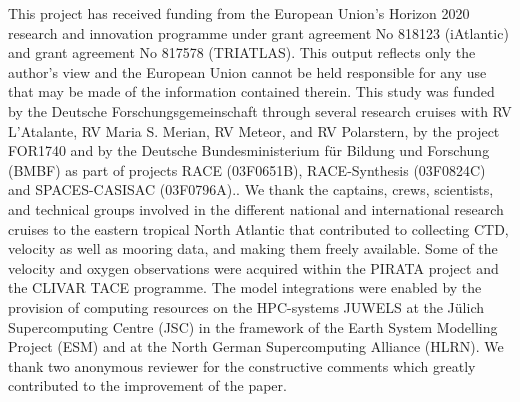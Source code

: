 \documentclass[os, manuscript]{copernicus}
\begin{document}

\begin{acknowledgements}
	This project has received funding from the European Union’s Horizon 2020 research and innovation programme under grant agreement No 818123 (iAtlantic) and grant agreement No 817578 (TRIATLAS). This output reflects only the author’s view and the European Union cannot be held responsible for any use that may be  made of the information contained therein. This study was funded by the Deutsche Forschungsgemeinschaft through several research cruises with RV L'Atalante, RV Maria S. Merian, RV Meteor, and RV Polarstern, by the project FOR1740 and by the Deutsche Bundesministerium f\"{u}r Bildung und Forschung (BMBF) as part of projects RACE (03F0651B), RACE-Synthesis (03F0824C) and SPACES-CASISAC (03F0796A).. We thank the captains, crews, scientists, and technical groups involved in the different national and international research cruises to the eastern tropical North Atlantic that contributed to collecting CTD, velocity as well as mooring data, and making them freely available. Some of the velocity and oxygen observations were acquired within the PIRATA project and the CLIVAR TACE programme. The model integrations were enabled by the provision of computing resources on the HPC-systems JUWELS at the Jülich Supercomputing Centre (JSC) in the framework of the Earth System Modelling Project (ESM) and at the North German Supercomputing Alliance (HLRN). We thank two anonymous reviewer for the constructive comments which greatly contributed to the  improvement of the paper.
\end{acknowledgements}






%
%
%

 
 


\end{document}
